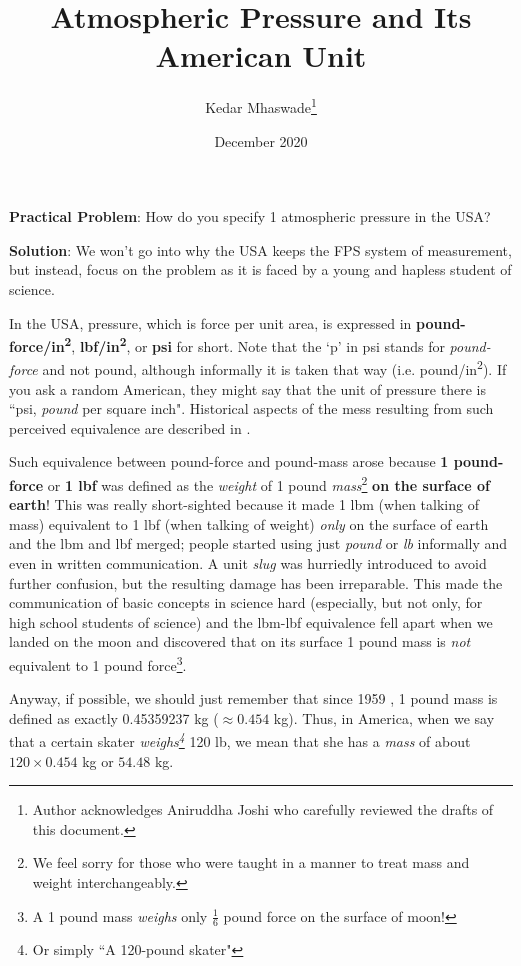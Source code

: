 \documentclass[a6paper]{article}
\begin{document}
\title{Atmospheric Pressure and Its American Unit}
\author{Kedar Mhaswade\footnote{Author acknowledges Aniruddha Joshi who carefully reviewed the drafts of this document.}}
\date{December 2020}
\maketitle
\textbf{Practical Problem}: 
How do you specify 1 atmospheric pressure in the USA?

\textbf{Solution}:
We won't go into why the USA keeps the FPS system of measurement, but instead, focus on the problem as it is faced by a young and hapless student of science.

In the USA, pressure, which is force per unit area, is expressed in \textbf{pound-force/in\textsuperscript{2}}, \textbf{lbf/in\textsuperscript{2}}, or \textbf{psi} for short. Note that the `p' in psi stands for \emph{pound-force} and not pound, although informally it is taken that way (i.e. pound/in\textsuperscript{2}). If you ask a random American, they might say that the unit of pressure there is ``psi, \emph{pound} per square inch". Historical aspects of the mess resulting from such perceived equivalence are described in \cite{esu}.

Such equivalence between pound-force and pound-mass arose because \textbf{1 pound-force} or \textbf{1 lbf} was defined as the \emph{weight} of 1 pound \emph{mass}\footnote{We feel sorry for those who were taught in a manner to treat mass and weight interchangeably.} \textbf{on the surface of earth}! This was really short-sighted because it made 1 lbm (when talking of mass) equivalent to 1 lbf (when talking of weight) \emph{only} on the surface of earth and the lbm and lbf merged; people started using just \emph{pound} or \emph{lb} informally and even in written communication. A unit \emph{slug} was hurriedly introduced to avoid further confusion, but the resulting damage has been irreparable. This made the communication of basic concepts in science hard (especially, but not only, for high school students of science) and the lbm-lbf equivalence fell apart when we landed on the moon and discovered that on its surface 1 pound mass is \emph{not} equivalent to 1 pound force\footnote{A 1 pound mass \emph{weighs} only $\frac{1}{6}$ pound force on the surface of moon!}.

Anyway, if possible, we should just remember that since 1959 \cite{pound-mass-current}, 1 pound mass is defined as exactly 0.45359237 \si{kg} ($\approx 0.454$ \si{kg}). Thus, in America, when we say that a certain skater \emph{weighs\footnote{Or simply ``A 120-pound skater"}} 120 lb, we mean that she has a \emph{mass} of about $120\times 0.454$ \si{kg} or $54.48$ \si{kg}.
\end{document}
